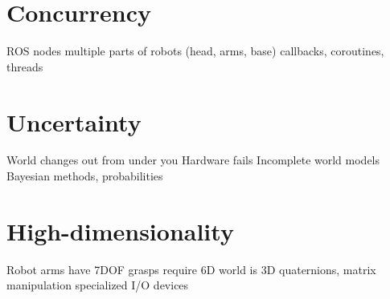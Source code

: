 \documentclass{article}
\begin{document}
\section{Concurrency}

ROS nodes
multiple parts of robots (head, arms, base)
callbacks, coroutines, threads

\section{Uncertainty}

World changes out from under you
Hardware fails
Incomplete world models
Bayesian methods, probabilities

\section{High-dimensionality}

Robot arms have 7DOF
grasps require 6D
world is 3D
quaternions, matrix manipulation
specialized I/O devices



\end{document}
